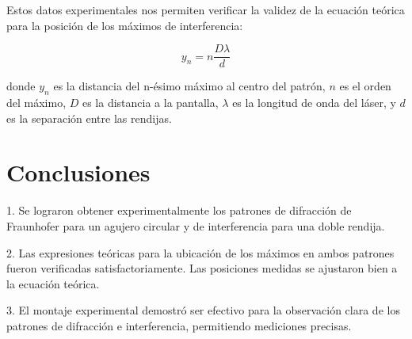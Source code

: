 \documentclass[twocolumn,a4paper,11pt]{scrartcl}
\begin{document}
Estos datos experimentales nos permiten verificar la validez de la ecuación teórica para la posición de los máximos de interferencia:

\begin{equation}
y_n = n\frac{D\lambda}{d}
\end{equation}

donde $y_n$ es la distancia del n-ésimo máximo al centro del patrón, $n$ es el orden del máximo, $D$ es la distancia a la pantalla, $\lambda$ es la longitud de onda del láser, y $d$ es la separación entre las rendijas.

\section{Conclusiones}

1. Se lograron obtener experimentalmente los patrones de difracción de Fraunhofer para un agujero circular y de interferencia para una doble rendija.

2. Las expresiones teóricas para la ubicación de los máximos en ambos patrones fueron verificadas satisfactoriamente. Las posiciones medidas se ajustaron bien a la ecuación teórica.

3. El montaje experimental demostró ser efectivo para la observación clara de los patrones de difracción e interferencia, permitiendo mediciones precisas.



\end{document}
